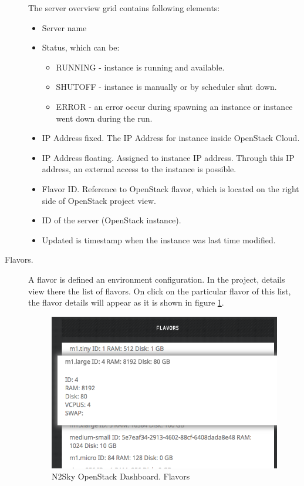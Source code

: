 \begin{description}
The server overview grid contains following elements:
\begin{itemize}
\item Server name 
\item Status, which can be: 
\begin{itemize}
\item RUNNING - instance is running and available. 
\item SHUTOFF - instance is manually or by scheduler shut down. 
\item ERROR - an error occur during spawning an instance or instance went down during the run.
\end{itemize}
\item IP Address fixed. The IP Address for instance inside OpenStack Cloud.
\item IP Address floating. Assigned to instance IP address. Through this IP address, an external access to the instance is possible. 
\item Flavor ID. Reference to OpenStack flavor, which is located on the right side of OpenStack project view.
\item ID of the server (OpenStack instance).
\item Updated is timestamp when the instance was last time modified. 
\end{itemize}
\item[Flavors.] A flavor is defined an environment configuration. In the project, details view there the list of flavors. On click on the particular flavor of this list, the flavor details will appear as it is shown in figure \ref{fig:openstack_flavors}.

 \begin{figure}[htbp]
\begin{center}
  \includegraphics[scale=0.5]{components/4/pics/openstack_flavors.png}
  \caption{N2Sky OpenStack Dashboard. Flavors}
  \label{fig:openstack_flavors}
\end{center}
\end{figure}


\end{description}
